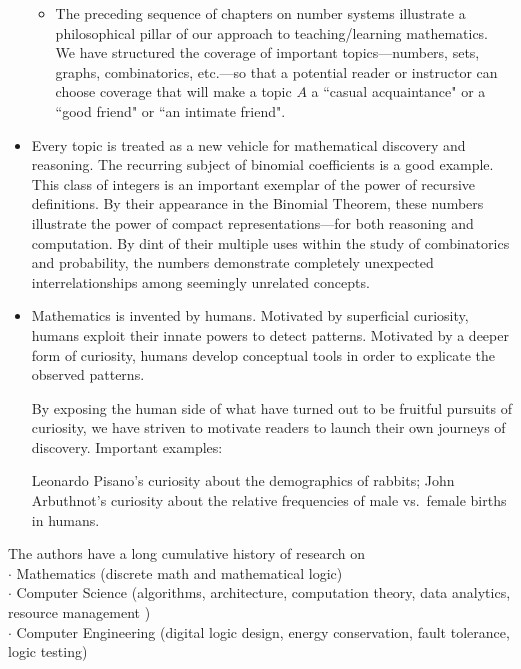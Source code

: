 \documentclass{article}[12pt]
\begin{document}
\begin{itemize}
\begin{itemize}
\item
The preceding sequence of chapters on number systems illustrate a philosophical pillar of our approach to teaching/learning mathematics.  We have structured the coverage of important topics---numbers, sets, graphs, combinatorics, etc.---so that a potential reader or instructor can choose coverage that will make a topic $A$ a ``casual acquaintance" or a ``good friend" or ``an intimate friend".
\end{itemize}

\item
Every topic is treated as a new vehicle for mathematical discovery and reasoning.  The recurring subject of binomial coefficients is a good example.  This class of integers is an important exemplar of the power of recursive definitions.  By their appearance in the Binomial Theorem, these numbers illustrate the power of compact representations---for both reasoning and computation.  By dint of their multiple uses within the study of combinatorics and probability, the numbers demonstrate completely unexpected interrelationships among seemingly unrelated concepts.

\item
Mathematics is invented by humans.  Motivated by superficial curiosity, humans exploit their innate powers to detect patterns.  Motivated by a deeper form of curiosity, humans develop conceptual tools in order to explicate the observed patterns.

\smallskip

By exposing the human side of what have turned out to be fruitful pursuits of curiosity, we have striven to motivate readers to launch their own journeys of discovery.  Important examples:

Leonardo Pisano's curiosity about the demographics of rabbits; John Arbuthnot's curiosity about the relative frequencies of male vs.~female births in humans. 
\end{itemize}

\bigskip


\medskip

\noindent
The authors have a long cumulative history of research on \\
$\cdot$ Mathematics (discrete math and mathematical logic) \\
$\cdot$ Computer Science (algorithms, architecture, computation theory, data analytics, resource management ) \\
$\cdot$ Computer Engineering (digital logic design, energy conservation, fault tolerance, logic testing)
\end{document}

